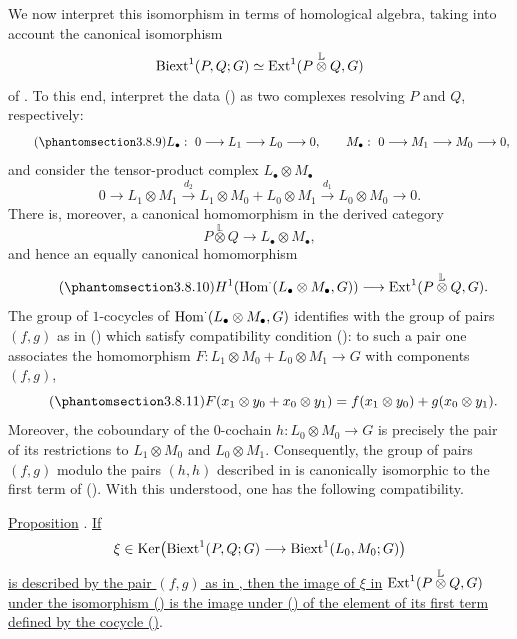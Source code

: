 We now interpret this isomorphism in terms of homological algebra,
taking into account the canonical isomorphism
\[
 \operatorname{Biext}^1(P,Q;G)\simeq
 \operatorname{Ext}^1(P\mathbin{\overset{\mathbb L}{\otimes}}Q,G)
\]
of .  To this end, interpret the data () as two complexes
resolving $P$ and $Q$, respectively:
\begin{equation}\tag{\SGARefTarget{sga7.sga7i.evii.n3-8-9}{3.8.9}}
 L_\bullet:\ 0\longrightarrow L_1\longrightarrow L_0
 \longrightarrow0,\qquad
 M_\bullet:\ 0\longrightarrow M_1\longrightarrow M_0
 \longrightarrow0,
\end{equation}
and consider the tensor-product complex $L_\bullet\otimes M_\bullet$
\[
 0\longrightarrow L_1\otimes M_1
 \xrightarrow{d_2}
 L_1\otimes M_0+L_0\otimes M_1
 \xrightarrow{d_1}
 L_0\otimes M_0\longrightarrow0.
\]
There is, moreover, a canonical homomorphism in the derived category
\[
 P\mathbin{\overset{\mathbb L}{\otimes}}Q
 \longrightarrow L_\bullet\otimes M_\bullet,
\]
and hence an equally canonical homomorphism
\begin{equation}\tag{\SGARefTarget{sga7.sga7i.evii.n3-8-10}{3.8.10}}
 H^1\!\left(\Hom^{\cdot}(L_\bullet\otimes M_\bullet,G)\right)
 \longrightarrow
 \Ext^1(P\mathbin{\overset{\mathbb L}{\otimes}}Q,G).
\end{equation}
The group of $1$-cocycles of
$\operatorname{Hom}^{\cdot}(L_\bullet\otimes M_\bullet,G)$ identifies with the
group of pairs $(f,g)$ as in () which satisfy compatibility
condition (): to such a pair one associates the homomorphism
$F:L_1\otimes M_0+L_0\otimes M_1\longrightarrow G$ with components
$(f,g)$,
\begin{equation}\tag{\SGARefTarget{sga7.sga7i.evii.n3-8-11}{3.8.11}}
 F(x_1\otimes y_0+x_0\otimes y_1)
 =f(x_1\otimes y_0)+g(x_0\otimes y_1).
\end{equation}
Moreover, the coboundary of the $0$-cochain
$h:L_0\otimes M_0\longrightarrow G$ is precisely the pair of its
restrictions to $L_1\otimes M_0$ and $L_0\otimes M_1$.  Consequently,
the group of pairs $(f,g)$ modulo the pairs $(h,h)$ described in
 is canonically isomorphic to the first term of ().
With this understood, one has the following compatibility.

\underline{Proposition} .
\underline{If}
\[
 \xi\in\operatorname{Ker}\!\left(
 \operatorname{Biext}^1(P,Q;G)\longrightarrow\operatorname{Biext}^1(L_0,M_0;G)\right)
\]
\underline{is described by the pair $(f,g)$ as in , then the
image of $\xi$ in}
$\operatorname{Ext}^1(P\mathbin{\overset{\mathbb L}{\otimes}}Q,G)$
\underline{under the isomorphism () is the image under
() of the element of its first term defined by the cocycle
()}.

